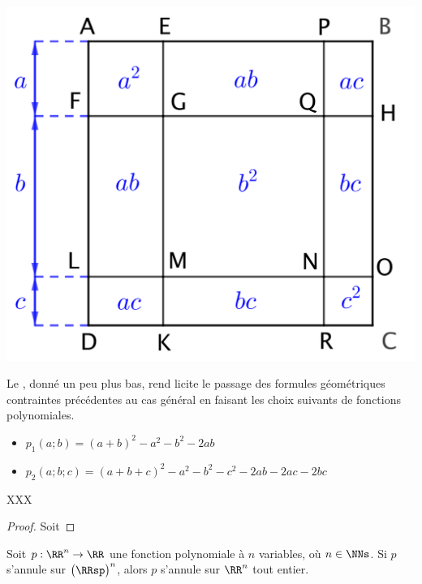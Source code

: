 \begin{center}
	\includegraphics[scale = .7]{(a+b)^3.png}
\end{center}

Le , donné un peu plus bas, rend licite le passage des formules géométriques contraintes précédentes au cas général en faisant les choix suivants de fonctions polynomiales.
%
\begin{itemize}[label=\small\textbullet]
	\item $p_1(a ; b) = (a + b)^2 - a^2 - b^2 - 2 ab$

	\item $p_2(a ; b ; c) = (a + b + c)^2 - a^2 - b^2 - c^2 - 2 ab - 2 ac - 2 bc$
\end{itemize}




\begin{preli} \label{poly-finite-zeros}
	XXX 
\end{preli}


\begin{proof}
	Soit
\end{proof}




\begin{fact} \label{poly-nullity-pos}
	Soit $p: \RR^n \rightarrow \RR$ une fonction polynomiale à $n$ variables, où $n \in \NNs$.
	Si $p$ s'annule sur $\big( \RRsp \big)^n$, alors $p$ s'annule sur $\RR^n$ tout entier. 
\end{fact}


